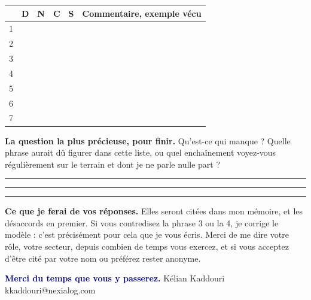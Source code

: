 \documentclass[11pt,a4paper]{article}
\begin{document}
\vspace{3mm}
\begin{center}\small
\renewcommand{\arraystretch}{2.7}
\setlength{\tabcolsep}{4pt}
\begin{tabular}{@{}c|c|c|c|c|p{9.4cm}@{}}
\toprule
 & \textbf{D} & \textbf{N} & \textbf{C} & \textbf{S} & \textbf{Commentaire, exemple vécu} \\
\midrule
1 & & & & & \\ \hline
2 & & & & & \\ \hline
\rowcolor{accent!8} 3 & & & & & \\ \hline
\rowcolor{accent!8} 4 & & & & & \\ \hline
5 & & & & & \\ \hline
6 & & & & & \\ \hline
7 & & & & & \\
\bottomrule
\end{tabular}
\end{center}

\vspace{3mm}
\textbf{La question la plus précieuse, pour finir.} Qu'est-ce qui manque ? Quelle phrase aurait dû
figurer dans cette liste, ou quel enchaînement voyez-vous régulièrement sur le terrain et dont je
ne parle nulle part ?

\vspace{16mm}\hrule\vspace{1mm}\hrule\vspace{1mm}\hrule

\vspace{4mm}
\begin{cle}
\textbf{Ce que je ferai de vos réponses.} Elles seront citées dans mon mémoire, et les
désaccords en premier. Si vous contredisez la phrase 3 ou la 4, je corrige le modèle : c'est
précisément pour cela que je vous écris. Merci de me dire votre rôle, votre secteur, depuis
combien de temps vous exercez, et si vous acceptez d'être cité par votre nom ou préférez rester
anonyme.
\end{cle}

\vspace{-1pt}
{\footnotesize\textcolor{navy}{\textbf{Merci du temps que vous y passerez.}} Kélian Kaddouri
\textbullet{} kkaddouri@nexialog.com}
\end{document}
